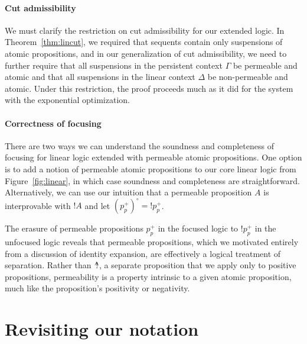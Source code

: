 \paragraph{Cut admissibility}
We must clarify the restriction on cut admissibility for our extended
logic. In Theorem~\ref{thm:lincut}, we required that sequents contain
only suspensions of atomic propositions, and in our generalization of
cut admissibility, we need to further require that all suspensions in
the persistent context $\Gamma$ be permeable and atomic and that all
suspensions in the linear context $\Delta$ be non-permeable and
atomic.  Under this restriction, the proof proceeds much as it did for
the system with the exponential optimization.

\paragraph{Correctness of focusing} There are two ways we can
understand the soundness and completeness of focusing for linear logic
extended with permeable atomic propositions. One option is to add a
notion of permeable atomic propositions to our core linear logic from
Figure~\ref{fig:linear}, in which case soundness and completeness are
straightforward. Alternatively, we can use our intuition that a
permeable proposition $A$ is interprovable with ${!}A$ and let
$(p^+_p)^\circ = {!}p^+_p$. 

The erasure of permeable propositions $p^+_p$ in the focused
logic to ${!}p^+_p$ in the unfocused logic reveals that
permeable propositions, which we motivated entirely from a discussion
of identity expansion, are effectively a logical treatment of
separation. Rather than ${\mbox{\hspace{2pt}$\mathbb !$\hspace{-4.44pt}$^\wedge$\hspace{-1pt}}}$, a separate proposition that we
apply only to positive propositions, permeability is a
property intrinsic to a given atomic proposition, much like the
proposition's positivity or negativity.

\section{Revisiting our notation}
\label{sec:linnote}

